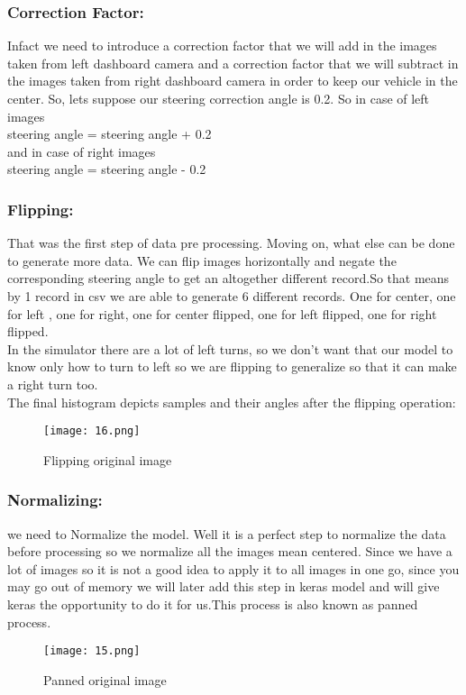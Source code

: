 \subsubsection{Correction Factor:}
 Infact we need to introduce a correction factor that we will add in the images taken from left dashboard camera and a correction factor that we will subtract in the images taken from right dashboard camera in order to keep our vehicle in the center. So, lets suppose our steering correction angle is 0.2. So in case of left images\\
steering angle = steering angle + 0.2\\
and in case of right images\\
steering angle = steering angle - 0.2

\subsubsection{Flipping:}
 That was the first step of data pre processing. Moving on, what else can be done to generate more data. We can flip images horizontally and negate the corresponding steering angle to get an altogether different record.So that means by 1 record in csv we are able to generate 6 different records. One for center, one for left , one for right, one for center flipped, one for left flipped, one for right flipped.\\
 In the simulator there are a lot of left turns, so we don’t want that our model to know only how to turn to left so we are flipping to generalize so that it can make a right turn too.\\
 
 The final histogram depicts samples and their angles after the flipping operation:
 \begin{figure}[H]
 	\centering
 	\texttt{[image: 16.png]}
 	\caption{Flipping original image}
 \end{figure}

\subsubsection{Normalizing:}
  we need to Normalize the model. Well it is a perfect step to normalize the data before processing so we normalize all the images mean centered. Since we have a lot of images so it is not a good idea to apply it to all images in one go, since you may go out of memory we will later add this step in keras model and will give keras the opportunity to do it for us.This process is also known as panned process.
   \begin{figure}[H]
  	\centering
  	\texttt{[image: 15.png]}
  	\caption{Panned original image}
  \end{figure}

